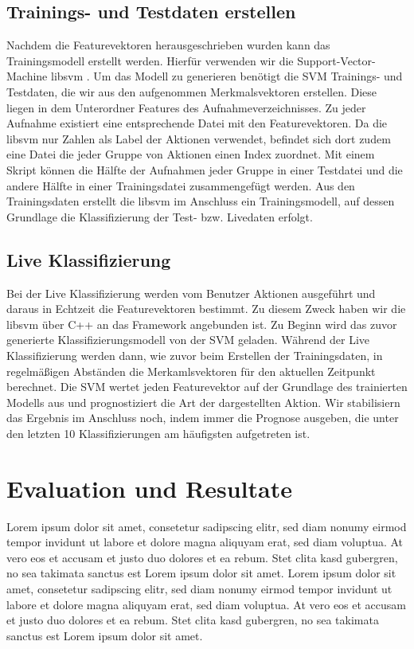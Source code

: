 \subsection{Trainings- und Testdaten erstellen}
Nachdem die Featurevektoren herausgeschrieben wurden kann das Trainingsmodell erstellt werden. Hierfür verwenden wir die Support-Vector-Machine libsvm \cite{libsvm}. Um das Modell zu generieren benötigt die SVM Trainings- und Testdaten, die wir aus den aufgenommen Merkmalsvektoren erstellen. Diese liegen in dem Unterordner \glqq{}Features\grqq{} des Aufnahmeverzeichnisses. Zu jeder Aufnahme existiert eine entsprechende Datei mit den Featurevektoren. Da die libsvm nur Zahlen als Label der Aktionen verwendet, befindet sich dort zudem eine Datei die jeder Gruppe von Aktionen einen Index zuordnet. Mit einem Skript können die Hälfte der Aufnahmen jeder Gruppe in einer Testdatei und die andere Hälfte in einer Trainingsdatei zusammengefügt werden. Aus den Trainingsdaten erstellt die libsvm im Anschluss ein Trainingsmodell, auf dessen Grundlage die Klassifizierung der Test- bzw. Livedaten erfolgt.

\subsection{Live Klassifizierung}
Bei der Live Klassifizierung werden vom Benutzer Aktionen ausgeführt und daraus in Echtzeit die Featurevektoren bestimmt. Zu diesem Zweck haben wir die libsvm über C++ an das Framework angebunden ist. Zu Beginn wird das zuvor generierte Klassifizierungsmodell von der SVM geladen. Während der Live Klassifizierung werden dann, wie zuvor beim Erstellen der Trainingsdaten, in regelmäßigen Abständen die Merkamlsvektoren für den aktuellen Zeitpunkt berechnet. Die SVM wertet jeden Featurevektor auf der Grundlage des trainierten Modells aus und prognostiziert die Art der dargestellten Aktion. Wir stabilisiern das Ergebnis im Anschluss noch, indem immer die Prognose ausgeben, die unter den letzten 10 Klassifizierungen am häufigsten aufgetreten ist. 



\section{Evaluation und Resultate}

Lorem ipsum dolor sit amet, consetetur sadipscing elitr, sed diam nonumy eirmod tempor invidunt ut labore et dolore magna aliquyam erat, sed diam voluptua. At vero eos et accusam et justo duo dolores et ea rebum. Stet clita kasd gubergren, no sea takimata sanctus est Lorem ipsum dolor sit amet. Lorem ipsum dolor sit amet, consetetur sadipscing elitr, sed diam nonumy eirmod tempor invidunt ut labore et dolore magna aliquyam erat, sed diam voluptua. At vero eos et accusam et justo duo dolores et ea rebum. Stet clita kasd gubergren, no sea takimata sanctus est Lorem ipsum dolor sit amet.

